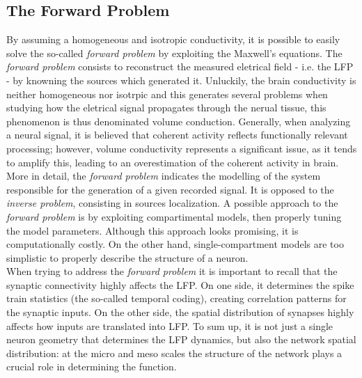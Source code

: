 \subsection{The Forward Problem}
By assuming a homogeneous and isotropic conductivity, it is possible to easily
solve the so-called \textit{forward problem} by exploiting the Maxwell's equations.
The \textit{forward problem} consists to reconstruct the measured eletrical field
- i.e. the LFP - by knowning the sources which generated it. Unluckily, the
brain conductivity is neither homogeneous nor isotrpic and this generates several
problems when studying how the eletrical signal propagates through the nerual tissue,
this phenomenon is thus denominated volume conduction. Generally, when analyzing a
neural signal, it is believed that coherent activity reflects functionally relevant
processing; however, volume conductivity represents a significant issue, as it
tends to amplify this, leading to an overestimation of the coherent activity
in brain.\\
More in detail, the \textit{forward problem} indicates the modelling of the system
responsible for the generation of a given recorded signal. It is opposed to the
\textit{inverse problem}, consisting in sources localization. A possible approach
to the \textit{forward problem} is by exploiting compartimental models, then
properly tuning the model parameters. Although this approach looks promising,
it is computationally costly. On the other hand, single-compartment models
are too simplistic to properly describe the structure of a neuron.\\
When trying to address the \textit{forward problem} it is important to recall
that the synaptic connectivity highly affects the LFP. On one side, it
determines the spike train statistics (the so-called temporal coding), creating
correlation patterns for the synaptic inputs. On the other side, the spatial
distribution of synapses highly affects how inputs are translated into LFP.
To sum up, it is not just a single neuron geometry that determines the LFP
dynamics, but also the network spatial distribution: at the micro and meso
scales the structure of the network plays a crucial role in determining
the function.


